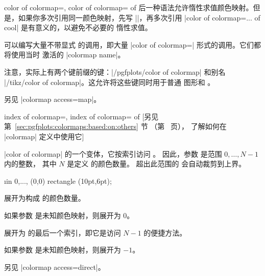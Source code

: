 \begin{pgfplotskeylist}{%
    color of colormap=,
    color of colormap= of %
}
    后一种语法允许惰性求值颜色映射。但是，如果你多次引用同一颜色映射，先写
    |\pgfplotsset{colormap/cool}|，再多次引用
    |color of colormap={... of cool}| 是有意义的，以避免不必要的
    惰性求值。

    可以编写大量不带显式  的调用，即大量
    |color of colormap=| 形式的调用。它们都将使用当时
    激活的 |colormap name|。

    注意，实际上有两个键前缀的键：|/pgfplots/color of colormap|
    和别名 |/tikz/color of colormap|。这允许将这些键同时用于普通
    \tikzname{} 图形和 \PGFPlots{}。

    另见 |colormap access=map|。
\end{pgfplotskeylist}

\begin{pgfplotskeylist}{%
    index of colormap=,
    index of colormap= of %
}
    [另见第~\ref{sec:pgfplots:colormaps:based:on:others} 节
    （第~\pageref{sec:pgfplots:colormaps:based:on:others} 页），
    了解如何在 |colormap| 定义中使用它]

    |color of colormap| 的一个变体，它按索引访问 。
    因此，参数  是范围 $0,\dotsc,N-1$ 内的整数，
    其中 $N$ 是定义  的颜色数量。
    超出此范围的  会自动裁剪到上界。

\begin{codeexample}[]
    \pgfplotsset{colormap/jet}
\foreach \i in {
    0,...,
}{
    \tikz\fill [
        index of colormap={\i of jet},
        thick,
        draw=.!60!black,
    ] (0,0) rectangle (10pt,6pt);
}
\end{codeexample}

    \begin{command}{\pgfplotscolormapsizeof{}}
        展开为构成  的颜色数量。

        如果参数  是未知颜色映射，则展开为 $0$。
    \end{command}

    \begin{command}{\pgfplotscolormaplastindexof{}}
        展开为  的最后一个索引，即它是访问
        $N-1$ 的便捷方法。

        如果参数  是未知颜色映射，则展开为 $-1$。
    \end{command}

    另见 |colormap access=direct|。
\end{pgfplotskeylist}

